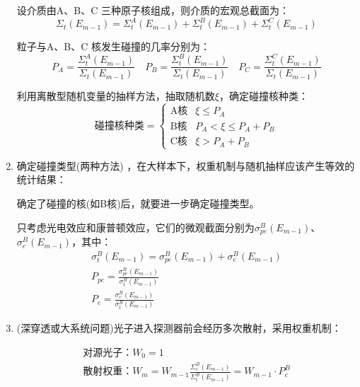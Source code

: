 \documentclass{article}
\begin{document}
\begin{enumerate}[label=\Alph*.]
    设介质由A、B、C 三种原子核组成，则介质的宏观总截面为：
    \begin{equation}
        \Sigma_t(E_{m-1})=\Sigma_t^A(E_{m-1})+\Sigma_t^B(E_{m-1})+\Sigma_t^C(E_{m-1})
    \end{equation}

    粒子与A、B、C 核发生碰撞的几率分别为：
    \begin{equation}
        P_A=\frac{\Sigma_t^A(E_{m-1})}{\Sigma_t(E_{m-1})}\quad P_B=\frac{\Sigma_t^B(E_{m-1})}{\Sigma_t(E_{m-1})}\quad P_C=\frac{\Sigma_t^C(E_{m-1})}{\Sigma_t(E_{m-1})}
    \end{equation}

    利用离散型随机变量的抽样方法，抽取随机数$\xi $，确定碰撞核种类：
    \begin{equation}
        \text{碰撞核种类} = \begin{cases}
            \text{A核} & \xi  \leq P_A \\
            \text{B核} & P_A< \xi  \leq P_A+P_B\\
            \text{C核} & \xi  > P_A+P_B
        \end{cases}
    \end{equation}
    \item 确定碰撞类型(两种方法) ，在大样本下，权重机制与随机抽样应该产生等效的统计结果：
    
    确定了碰撞的核(如B核)后，就要进一步确定碰撞类型。
    
    只考虑光电效应和康普顿效应，它们的微观截面分别为$\sigma_{pe}^B(E_{m-1})$、$\sigma_c^B(E_{m-1})$，其中：
    \begin{equation}
        \begin{gathered}
            \sigma_t^B(E_{m-1})=\sigma_{pe}^B(E_{m-1})+\sigma_c^B(E_{m-1})\\
            P_{pe}=\frac{\sigma_{pe}^B(E_{m-1})}{\sigma_t^B(E_{m-1})}\\
            P_c=\frac{\sigma_{c}^B(E_{m-1})}{\sigma_t^B(E_{m-1})}
        \end{gathered}
    \end{equation}

    \item (深穿透或大系统问题)光子进入探测器前会经历多次散射，采用权重机制：
    
    \begin{equation}
        \begin{gathered}
            \text{对源光子：}W_0=1\\
            \text{散射权重：}W_m=W_{m-1}\frac{\Sigma_c^B(E_{m-1})}{\Sigma_t^B(E_{m-1})}=W_{m-1}\cdot P_c^B\\
        \end{gathered}
    \end{equation}
    

\end{enumerate}
\end{document}
